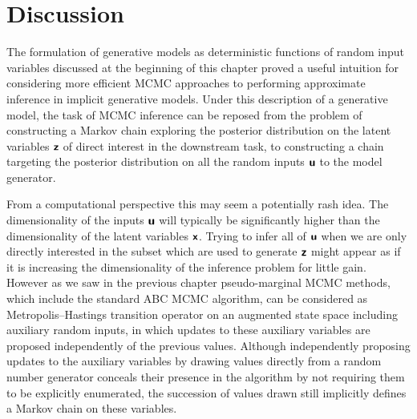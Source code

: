 \section{Discussion}

The formulation of generative models as deterministic functions of random input variables discussed at the beginning of this chapter proved a useful intuition for considering more efficient \ac{MCMC} approaches to performing approximate inference in implicit generative models. Under this description of a generative model, the task of \ac{MCMC} inference can be reposed from the problem of constructing a Markov chain exploring the posterior distribution on the latent variables $\boldsymbol{\mathsf{z}}$ of direct interest in the downstream task, to constructing a chain targeting the posterior distribution on all the random inputs $\boldsymbol{\mathsf{u}}$ to the model generator. 

From a computational perspective this may seem a potentially rash idea. The dimensionality of the inputs $\boldsymbol{\mathsf{u}}$ will typically be significantly higher than the dimensionality of the latent variables $\boldsymbol{\mathsf{x}}$. Trying to infer all of $\boldsymbol{\mathsf{u}}$ when we are only directly interested in the subset which are used to generate $\boldsymbol{\mathsf{z}}$ might appear as if it is increasing the dimensionality of the inference problem for little gain. However as we saw in the previous chapter pseudo-marginal \ac{MCMC} methods, which include the standard \ac{ABC} \ac{MCMC} algorithm, can be considered as Metropolis--Hastings transition operator on an augmented state space including auxiliary random inputs, in which updates to these auxiliary variables are proposed independently of the previous values. Although independently proposing updates to the auxiliary variables by drawing values directly from a random number generator conceals their presence in the algorithm by not requiring them to be explicitly enumerated, the succession of values drawn still implicitly defines a Markov chain on these variables.

